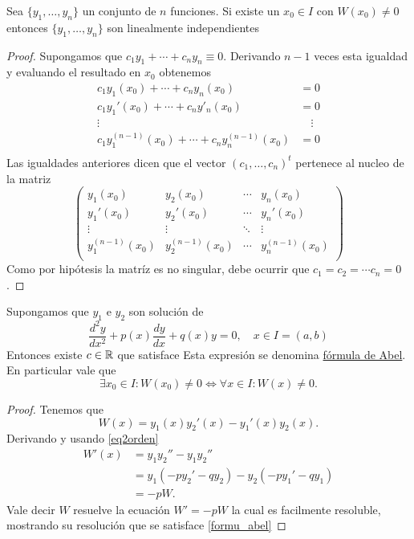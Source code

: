 \begin{lema}
 Sea $\{y_1,\ldots,y_n\}$ un conjunto de $n$ funciones. Si existe un $x_0\in I$ con $W(x_0)\neq 0$ entonces $\{y_1,\ldots,y_n\}$ son
linealmente independientes
\end{lema}


\begin{proof} Supongamos que $c_1y_1+\cdots+c_ny_n\equiv 0$. Derivando $n-1$ veces esta igualdad y evaluando el resultado en $x_0$ obtenemos
\[
\begin{split}
c_1y_1(x_0)+\cdots+c_ny_n(x_0)&=0\\
c_1y_1'(x_0)+\cdots+c_ny'_n(x_0)&=0\\
\vdots \quad& \quad\vdots\\
c_1y_1^{(n-1)}(x_0)+\cdots+c_ny^{(n-1)}_n(x_0)&=0\\
\end{split}
\]
Las igualdades anteriores dicen que el vector $(c_1,\ldots,c_n)^t$ pertenece al nucleo de la matriz
\[
\begin{pmatrix}
y_1(x_0) & y_2(x_0) & \cdots &y_n(x_0)\\
y_1'(x_0) & y_2'(x_0) & \cdots &y_n'(x_0)\\
\vdots & \vdots &\ddots& \vdots\\
y_1^{(n-1)}(x_0) & y_2^{(n-1)}(x_0) & \cdots &y_n^{(n-1)}(x_0)\\
\end{pmatrix}
\]
Como por hipótesis la matríz es no singular, debe ocurrir que $c_1=c_2=\cdots c_n=0$.
\end{proof}

\begin{teorema}
 Supongamos que $y_1$ e $y_2$ son solución de
\begin{equation}\label{eq2orden}\frac{d^2y}{dx^2}+p(x)\frac{dy}{dx}+q(x)y=0,\quad x\in I=(a,b)\end{equation}
Entonces existe $c\in\mathbb{R}$ que satisface
Esta expresión se denomina \href{http://en.wikipedia.org/wiki/Abel's_identity}{fórmula de Abel}. En particular vale que
\[\exists x_0\in I: W(x_0)\neq 0 \Longleftrightarrow \forall x\in I: W(x)\neq 0 .\]
\end{teorema}

\begin{proof} Tenemos que
\[W(x)=y_1(x)y_2'(x)-y_1'(x)y_2(x).\]
Derivando y usando \eqref{eq2orden}
\[\begin{split}W'(x)&=y_1y_2''-y_1y_2''\\
&=y_1(-py_2'-qy_2)-y_2(-py_1'-qy_1)\\
&=-pW.
\end{split}
\]
Vale decir $W$ resuelve la ecuación $W'=-pW$ la cual es facilmente resoluble, mostrando su resolución que se satisface \eqref{formu_abel}
\end{proof}

